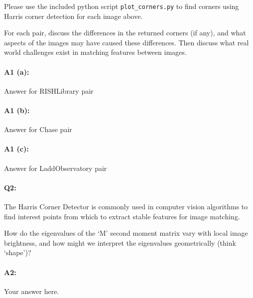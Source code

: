 Please use the included python script \texttt{plot\_corners.py} to find corners using Harris corner detection for each image above.

For each pair, discuss the differences in the returned corners (if any), and what aspects of the images may have caused these differences. Then discuss what real world challenges exist in matching features between images.


\paragraph{A1 (a):} Answer for RISHLibrary pair






\pagebreak
\paragraph{A1 (b):} Answer for Chase pair






\pagebreak
\paragraph{A1 (c):} Answer for LaddObservatory pair








\pagebreak
\paragraph{Q2:} 
The Harris Corner Detector is commonly used in computer vision algorithms to find interest points from which to extract stable features for image matching. 

How do the eigenvalues of the `M' second moment matrix vary with local image brightness, and how might we interpret the eigenvalues geometrically (think `shape')?

\paragraph{A2:} Your answer here.







